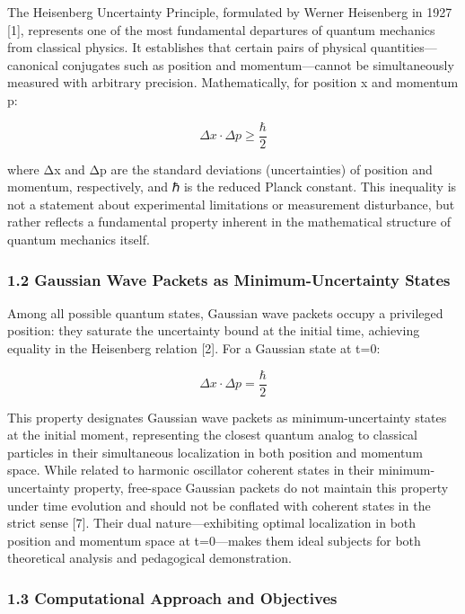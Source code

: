 \documentclass[
]{article}
\begin{document}
The Heisenberg Uncertainty Principle, formulated by Werner Heisenberg in
1927 {[}1{]}, represents one of the most fundamental departures of
quantum mechanics from classical physics. It establishes that certain
pairs of physical quantities---canonical conjugates such as position and
momentum---cannot be simultaneously measured with arbitrary precision.
Mathematically, for position x and momentum p:

\[\Delta x \cdot \Delta p \geq \frac{\hbar}{2}\]

where Δx and Δp are the standard deviations (uncertainties) of position
and momentum, respectively, and ℏ is the reduced Planck constant. This
inequality is not a statement about experimental limitations or
measurement disturbance, but rather reflects a fundamental property
inherent in the mathematical structure of quantum mechanics itself.

\subsubsection{1.2 Gaussian Wave Packets as Minimum-Uncertainty
States}\label{gaussian-wave-packets-as-minimum-uncertainty-states}

Among all possible quantum states, Gaussian wave packets occupy a
privileged position: they saturate the uncertainty bound at the initial
time, achieving equality in the Heisenberg relation {[}2{]}. For a
Gaussian state at t=0:

\[\Delta x \cdot \Delta p = \frac{\hbar}{2}\]

This property designates Gaussian wave packets as minimum-uncertainty
states at the initial moment, representing the closest quantum analog to
classical particles in their simultaneous localization in both position
and momentum space. While related to harmonic oscillator coherent states
in their minimum-uncertainty property, free-space Gaussian packets do
not maintain this property under time evolution and should not be
conflated with coherent states in the strict sense {[}7{]}. Their dual
nature---exhibiting optimal localization in both position and momentum
space at t=0---makes them ideal subjects for both theoretical analysis
and pedagogical demonstration.

\subsubsection{1.3 Computational Approach and
Objectives}\label{computational-approach-and-objectives}
\end{document}
